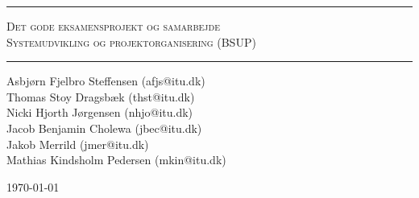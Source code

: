 \begin{titlepage}

\begin{center}

\topskip 7cm





\rule{\linewidth}{0.6mm}

\vspace{2mm}

\textsc{\LARGE Det gode eksamensprojekt og samarbejde} \\
\textsc{Systemudvikling og projektorganisering (BSUP)}
\vspace{1cm}
\rule{\linewidth}{0.4mm}

Asbj\o rn Fjelbro Steffensen (afjs@itu.dk)\\ Thomas Stoy Dragsb\ae k (thst@itu.dk)\\ Nicki Hjorth J\o rgensen (nhjo@itu.dk)\\ Jacob Benjamin Cholewa (jbec@itu.dk)\\ Jakob Merrild (jmer@itu.dk)\\ Mathias Kindsholm Pedersen (mkin@itu.dk)




\vfill

\large \today
\end{center}


\end{titlepage}